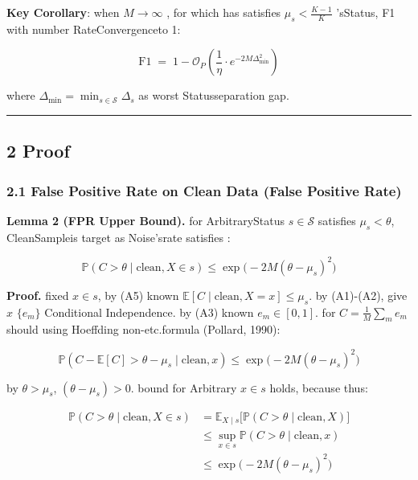 \documentclass[
  12pt,
]{article}
\begin{document}
\textbf{Key Corollary}: when  \(M \to \infty\) , for which has satisfies 
\(\mu_s < \frac{K-1}{K}\) 'sStatus, F1 with number RateConvergenceto  1: 

\[\text{F1} \;=\; 1 - \mathcal{O}_P\!\left(\frac{1}{\eta} \cdot e^{-2M\Delta_{\min}^2}\right)\]

where \(\Delta_{\min} = \min_{s \in \mathcal{S}} \Delta_s\)
as worst Statusseparation gap. 

\begin{center}\rule{0.5\linewidth}{0.5pt}\end{center}

\subsection{2 Proof}\label{ux8bc1ux660e}

\subsubsection{2.1 False Positive Rate on Clean Data (False Positive
Rate)}\label{ux6e05ux6d01ux6570ux636eux7684ux5047ux9633ux6027ux7387-false-positive-rate}

\textbf{Lemma 2 (FPR Upper Bound).} for ArbitraryStatus \(s \in \mathcal{S}\) satisfies 
\(\mu_s < \theta\), CleanSampleis target as Noise'srate satisfies : 

\[\mathbb{P}(C > \theta \mid \text{clean}, X \in s) \leq \exp\!\bigl(-2M(\theta - \mu_s)^2\bigr)\]

\textbf{Proof.} fixed  \(x \in s\), by  (A5) known
\(\mathbb{E}[C \mid \text{clean}, X = x] \leq \mu_s\). by 
(A1)-(A2), give  \(x\)  \(\{e_m\}\) Conditional Independence. by  (A3) known
\(e_m \in [0, 1]\). for  \(C = \frac{1}{M}\sum_m e_m\) should using  Hoeffding
non-etc.formula (Pollard, 1990):

\[\mathbb{P}(C - \mathbb{E}[C] > \theta - \mu_s \mid \text{clean}, x) \leq \exp\!\bigl(-2M(\theta - \mu_s)^2\bigr)\]

by  \(\theta > \mu_s\), \((\theta - \mu_s) > 0\). bound for Arbitrary
\(x \in s\) holds, because thus: 

\[\begin{aligned}
\mathbb{P}(C > \theta \mid \text{clean}, X \in s) 
&= \mathbb{E}_{X \mid s}\bigl[ \mathbb{P}(C > \theta \mid \text{clean}, X) \bigr] \\
&\leq \sup_{x \in s} \mathbb{P}(C > \theta \mid \text{clean}, x) \\
&\leq \exp\!\bigl(-2M(\theta - \mu_s)^2\bigr)
\end{aligned}\]
\end{document}
